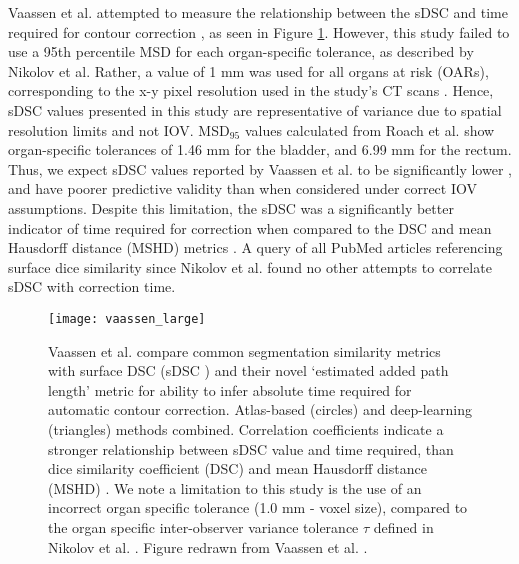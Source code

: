 Vaassen et al. attempted to measure the relationship between the sDSC and time required for contour correction \cite{vaassen2020}, as seen in Figure \ref{fig:vaassen}. However, this study failed to use a 95th percentile MSD for each organ-specific tolerance, as described by Nikolov et al. Rather, a value of 1 mm was used for all organs at risk (OARs), corresponding to the x-y pixel resolution used in the study's CT scans \cite{vaassen2020}. Hence, sDSC values presented in this study are representative of variance due to spatial resolution limits and not IOV. MSD$_{95}$ values calculated from Roach et al. show organ-specific tolerances of 1.46 mm for the bladder, and 6.99 mm for the rectum. Thus, we expect sDSC values reported by Vaassen et al. to be significantly lower \cite{Nikolov_2018}, and have poorer predictive validity than when considered under correct IOV assumptions. Despite this limitation, the sDSC was a significantly better indicator of time required for correction when compared to the DSC and mean Hausdorff distance (MSHD) metrics \cite{vaassen2020}.
A query of all PubMed articles referencing surface dice similarity since Nikolov et al. found no other attempts to correlate sDSC with correction time.

\begin{figure}[H]
	\begin{center}
		\texttt{[image: vaassen\_large]}
		\caption{Vaassen et al. compare common segmentation similarity metrics with surface DSC (sDSC \cite{Nikolov_2018}) and their novel `estimated added path length' metric for ability to infer absolute time required for automatic contour correction. Atlas-based (circles) and deep-learning (triangles) methods combined. Correlation coefficients indicate a stronger relationship between sDSC value and time required, than dice similarity coefficient (DSC) and mean Hausdorff distance (MSHD) \cite{Vaassen_2020}. We note a limitation to this study is the use of an incorrect organ specific tolerance (1.0 mm - voxel size), compared to the organ specific inter-observer variance tolerance $\tau$ defined in Nikolov et al. \cite{Nikolov_2018}. Figure redrawn from Vaassen et al.  \cite{Vaassen_2020}.}
		\label{fig:vaassen}
	\end{center}
\end{figure}



